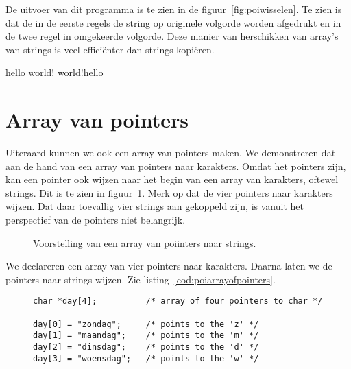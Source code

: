 De uitvoer van dit programma is te zien in de figuur~\ref{fig:poiwisselen}. Te zien is dat de in de eerste regels de string op originele volgorde worden afgedrukt en in de twee regel in omgekeerde volgorde. Deze manier van herschikken van array's van strings is veel efficiënter dan strings kopiëren.

\begin{dosbox}[title=Verwisselen van twee stings.,label=fig:poiwisselen]
hello world!
world!hello
\end{dosbox}


\section{Array van pointers}
Uiteraard kunnen we ook een array van pointers maken. We demonstreren dat aan de hand van een array van pointers naar karakters. Omdat het pointers zijn, kan een pointer ook wijzen naar het begin van een array van karakters, oftewel strings. Dit is te zien in figuur~\ref{fig:poiarrayofpointers}. Merk op dat de vier pointers naar karakters wijzen. Dat daar toevallig vier strings aan gekoppeld zijn, is vanuit het perspectief van de pointers niet belangrijk.

\begin{figure}[!ht]
\centering
{}
\caption{Voorstelling van een array van poiinters naar strings.}
\label{fig:poiarrayofpointers}
\end{figure}

We declareren een array van vier pointers naar karakters. Daarna laten we de pointers naar strings wijzen. Zie listing~\ref{cod:poiarrayofpointers}.

\begin{figure}[!ht]
\begin{lstlisting}[caption=Een array van pointers.,label=cod:poiarrayofpointers]
char *day[4];          /* array of four pointers to char */

day[0] = "zondag";     /* points to the 'z' */
day[1] = "maandag";    /* points to the 'm' */
day[2] = "dinsdag";    /* points to the 'd' */
day[3] = "woensdag";   /* points to the 'w' */
\end{lstlisting}
\end{figure}


